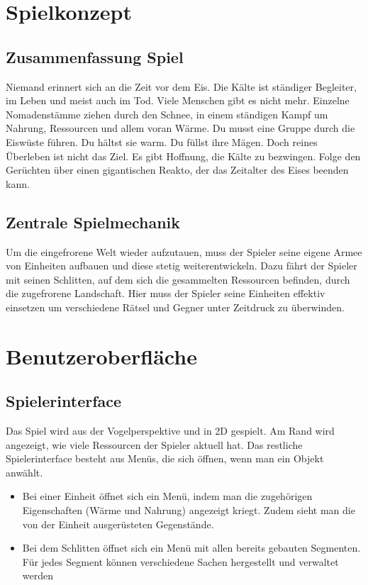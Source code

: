 \documentclass[a4paper,
  twoside, %
  headlines=2.1 %
  ]{scrartcl}
\author{\yourname}
\title{\gamename}
\subtitle{\lecture} %
\date{\today} %
\begin{document}
\maketitle
\newpage
\tableofcontents

\section{Spielkonzept}

	\subsection{Zusammenfassung Spiel}
	Niemand erinnert sich an die Zeit vor dem Eis. Die Kälte ist ständiger Begleiter, im Leben und meist auch im Tod. 
	Viele Menschen gibt es nicht mehr. Einzelne Nomadenstämme ziehen durch den Schnee, in einem ständigen Kampf um Nahrung, Ressourcen und allem voran Wärme.
	Du musst eine Gruppe durch die Eiswüste führen. Du hältst sie warm. Du füllst ihre Mägen. Doch reines Überleben ist nicht das Ziel. 
	Es gibt Hoffnung, die Kälte zu bezwingen. Folge den Gerüchten über einen gigantischen Reakto, der das Zeitalter des Eises beenden kann.

	\subsection{Zentrale Spielmechanik}
		Um die eingefrorene Welt wieder aufzutauen, muss der Spieler seine
		eigene Armee von Einheiten aufbauen und diese stetig weiterentwickeln. Dazu
		fährt der Spieler mit seinen Schlitten, auf dem sich die gesammelten Ressourcen
		befinden, durch die zugefrorene Landschaft. Hier muss der Spieler seine Einheiten effektiv einsetzen um
		verschiedene Rätsel und Gegner unter Zeitdruck zu überwinden.
\section{Benutzeroberfläche}
	\subsection{Spielerinterface}
	     Das Spiel wird aus der Vogelperspektive und in 2D gespielt. Am Rand wird angezeigt, wie viele Ressourcen der Spieler aktuell hat. Das restliche Spielerinterface besteht aus Menüs, die sich öffnen, wenn man 
ein Objekt anwählt.
\begin{itemize}
\item Bei einer Einheit öffnet sich ein Menü, indem man die zugehörigen 
Eigenschaften (Wärme und Nahrung) angezeigt kriegt. Zudem sieht man die 
von der Einheit ausgerüsteten Gegenstände.
\item Bei dem Schlitten öffnet sich ein Menü mit allen bereits gebauten 
Segmenten. Für jedes Segment können verschiedene Sachen hergestellt und 
verwaltet werden
\end{itemize}
		
\end{document}
